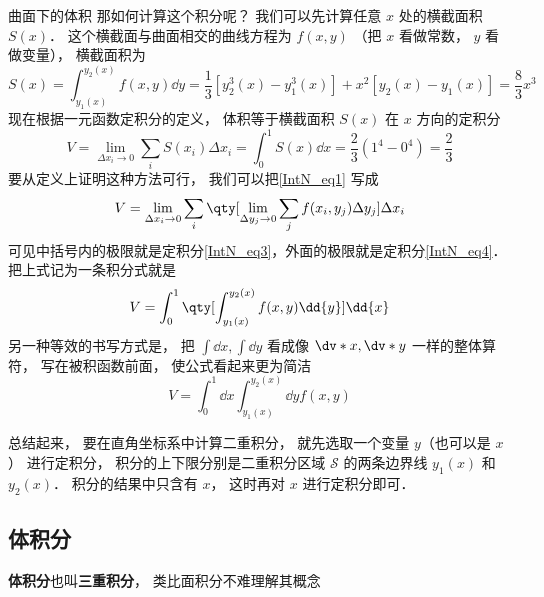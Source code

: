 \begin{example}{曲面下的体积}
那如何计算这个积分呢？ 我们可以先计算任意 $x$ 处的横截面积 $S(x)$． 这个横截面与曲面相交的曲线方程为 $f(x,y)$ （把 $x$ 看做常数， $y$ 看做变量）， 横截面积为
\begin{equation}\label{IntN_eq3}
S(x) = \int_{y_1(x)}^{y_2(x)} f(x,y) \dd{y} = \frac13 [y_2^3(x) - y_1^3(x)] + x^2[y_2(x) - y_1(x)] = \frac83 x^3
\end{equation}
现在根据一元函数定积分的定义， 体积等于横截面积 $S(x)$ 在 $x$ 方向的定积分
\begin{equation}\label{IntN_eq4}
V = \lim_{\Delta x_i\to 0} \sum_{i} S(x_i) \Delta x_i = \int_0^1 S(x) \dd{x} = \frac23 (1^4 -0^4) = \frac23
\end{equation}
要从定义上证明这种方法可行， 我们可以把\autoref{IntN_eq1} 写成
\begin{equation}
V = \lim_{\Delta x_i\to 0} \sum_{i} \qty[\lim_{\Delta y_j\to 0}\sum_{j} f(x_i,y_j) \Delta y_j ] \Delta x_i
\end{equation}
可见中括号内的极限就是定积分\autoref{IntN_eq3}，外面的极限就是定积分\autoref{IntN_eq4}． 把上式记为一条积分式就是
\begin{equation}
V = \int_0^1 \qty[\int_{y_1(x)}^{y_2(x)} f(x,y) \dd{y}] \dd{x}
\end{equation}
另一种等效的书写方式是， 把 $\int \dd{x}, \int \dd{y}$ 看成像 $\dv*{x}, \dv*{y}$ 一样的整体算符， 写在被积函数前面， 使公式看起来更为简洁
\begin{equation}\label{IntN_eq7}
V = \int_0^1 \dd{x} \int_{y_1(x)}^{y_2(x)} \dd{y} f(x,y)
\end{equation}
\end{example}

总结起来， 要在直角坐标系中计算二重积分， 就先选取一个变量 $y$（也可以是 $x$） 进行定积分， 积分的上下限分别是二重积分区域 $\mathcal{S}$ 的两条边界线 $y_1(x)$ 和 $y_2(x)$． 积分的结果中只含有 $x$， 这时再对 $x$ 进行定积分即可．

\subsection{体积分}
\textbf{体积分}也叫\textbf{三重积分}， 类比面积分不难理解其概念

